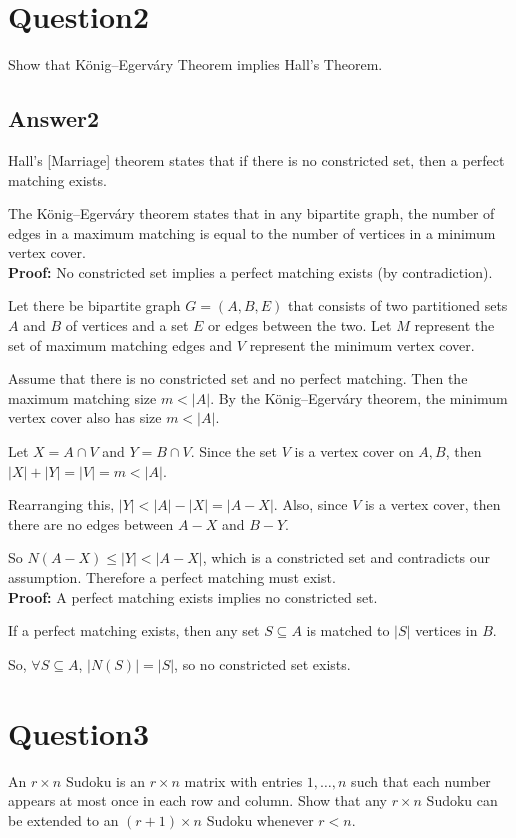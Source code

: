 \documentclass[twoside]{article}
\begin{document}
\newpage
\section{Question2}
Show that K\"{o}nig--Egerváry Theorem implies Hall’s Theorem. 

\subsection{Answer2}

Hall’s [Marriage] theorem states that if there is no constricted set, then a perfect matching exists. 

The K\"{o}nig--Egerváry theorem states that in any bipartite graph, the number of edges in a maximum matching is equal to the number of vertices in a minimum vertex cover.\\[12pt]

\textbf{Proof:} No constricted set implies a perfect matching exists (by contradiction).

Let there be bipartite graph $G=(A, B, E)$ that consists of  two partitioned sets $A$ and $B$ of vertices and a set $E$ or edges between the two. Let $M$ represent the set of maximum matching edges and $V$ represent the minimum vertex cover.

Assume that there is no constricted set and no perfect matching. Then the maximum matching size $m < |A|$. By the K\"{o}nig--Egerváry theorem, the minimum vertex cover also has size $m < |A|$.

Let $X = A \cap V$ and $Y = B \cap V$.  Since the set $V$ is a vertex cover on ${A, B}$, then 
$|X| + |Y| = |V| = m < |A|$.

Rearranging this, $|Y| < |A| - |X| = |A - X|$.
Also, since $V$ is a vertex cover, then there are no edges between $A - X$ and $B - Y$.

So $N(A - X) \leq |Y| < |A - X|$, which is a constricted set and contradicts our assumption. Therefore a perfect matching must exist.\\[12pt]

\textbf{Proof:} A perfect matching exists implies no constricted set.

If a perfect matching exists, then any set $S \subseteq A$ is matched to $|S|$ vertices in $B$. 

So, $\forall S \subseteq A$, $|N(S)|=|S|$, so no constricted set exists.
 

\newpage
\section{Question3}
An $r \times n$ Sudoku is an $r \times n$ matrix with entries ${1, \ldots ,n}$ such that each number appears at most once in each row and column. Show that any $r \times n$ Sudoku can be extended to an $(r+1) \times n$ Sudoku whenever $r < n$.
\end{document}
